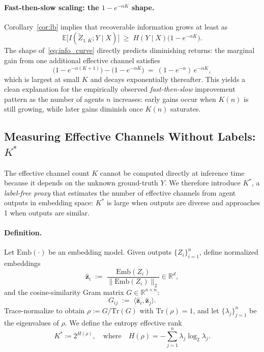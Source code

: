 \documentclass{article}
\theoremstyle{plain}
\theoremstyle{definition}
\theoremstyle{remark}
\newcommand{\EE}{\mathbb{E}}
\begin{document}
\vspace{-0.2cm}
\paragraph{Fast-then-slow scaling: the $1-e^{-\alpha K}$ shape.}
Corollary~\ref{cor:lb} implies that recoverable information grows at least as
\begin{equation}
\EE\big[I(\tilde Z_{1:K};Y\mid X)\big] \;\ge\; H(Y\mid X)\big(1-e^{-\alpha K}\big).
\label{eq:info_curve}
\end{equation}
The shape of~\eqref{eq:info_curve} directly predicts diminishing returns: the marginal gain from one additional effective channel satisfies
\begin{equation}
\big(1-e^{-\alpha (K+1)}\big)-\big(1-e^{-\alpha K}\big)
~=~ (1-e^{-\alpha})\,e^{-\alpha K},
\label{eq:marginal_decay}
\end{equation}
which is largest at small $K$ and decays exponentially thereafter.
This yields a clean explanation for the empirically observed \emph{fast-then-slow} improvement pattern as the number of agents $n$ increases:
early gains occur when $K(n)$ is still growing, while later gains diminish once $K(n)$ saturates.




\subsection{Measuring Effective Channels Without Labels: $K^*$}
\label{sec:Kstar}

The effective channel count $K$ cannot be computed directly at inference time because it depends on the unknown ground-truth $Y$. We therefore introduce $K^*$, a \emph{label-free proxy} that estimates the number of effective channels from agent outputs in embedding space: $K^*$ is large when outputs are diverse and approaches 1 when outputs are similar.

\paragraph{Definition.}
Let $\mathrm{Emb}(\cdot)$ be an embedding model.
Given outputs $\{Z_i\}_{i=1}^n$, define normalized embeddings
\begin{equation}
\hat{\mathbf{z}}_i \;:=\; \frac{\mathrm{Emb}(Z_i)}{\|\mathrm{Emb}(Z_i)\|_2}\in\mathbb{R}^d,
\end{equation}
and the cosine-similarity Gram matrix $G\in\mathbb{R}^{n\times n}$:
\begin{equation}
G_{ij} \;:=\; \langle \hat{\mathbf{z}}_i,\hat{\mathbf{z}}_j\rangle.
\end{equation}
Trace-normalize to obtain $\rho:=G/\mathrm{Tr}(G)$ with $\mathrm{Tr}(\rho)=1$, and let $\{\lambda_j\}_{j=1}^n$ be the eigenvalues of $\rho$.
We define the entropy effective rank
\begin{equation}
K^* \coloneqq 2^{H(\rho)},
\quad \text{where} \quad
H(\rho) = -\sum_{j=1}^n \lambda_j \log_2 \lambda_j.
\label{eq:Kstar_def}
\end{equation}
\end{document}

